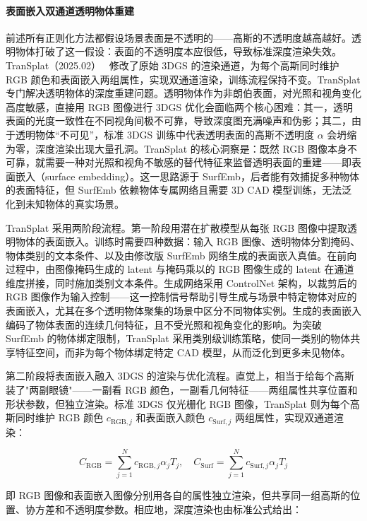 \paragraph{表面嵌入双通道透明物体重建}

前述所有正则化方法都假设场景表面是不透明的——高斯的不透明度越高越好。透明物体打破了这一假设：表面的不透明度本应很低，导致标准深度渲染失效。TranSplat（2025.02）~\cite{2502_07840} 修改了原始 3DGS 的渲染通道，为每个高斯同时维护 RGB 颜色和表面嵌入两组属性，实现双通道渲染，训练流程保持不变。TranSplat 专门解决透明物体的深度重建问题。透明物体作为非朗伯表面，对光照和视角变化高度敏感，直接用 RGB 图像进行 3DGS 优化会面临两个核心困难：其一，透明表面的光度一致性在不同视角间极不可靠，导致深度图充满噪声和伪影；其二，由于透明物体“不可见”，标准 3DGS 训练中代表透明表面的高斯不透明度 $\alpha$ 会坍缩为零，深度渲染出现大量孔洞。TranSplat 的核心洞察是：既然 RGB 图像本身不可靠，就需要一种对光照和视角不敏感的替代特征来监督透明表面的重建——即表面嵌入（surface embedding）。这一思路源于 SurfEmb，后者能有效捕捉多种物体的表面特征，但 SurfEmb 依赖物体专属网络且需要 3D CAD 模型训练，无法泛化到未知物体的真实场景。

TranSplat 采用两阶段流程。第一阶段用潜在扩散模型从每张 RGB 图像中提取透明物体的表面嵌入。训练时需要四种数据：输入 RGB 图像、透明物体分割掩码、物体类别的文本条件、以及由修改版 SurfEmb 网络生成的表面嵌入真值。在前向过程中，由图像掩码生成的 latent 与掩码乘以的 RGB 图像生成的 latent 在通道维度拼接，同时施加类别文本条件。生成网络采用 ControlNet 架构，以裁剪后的 RGB 图像作为输入控制——这一控制信号帮助引导生成与场景中特定物体对应的表面嵌入，尤其在多个透明物体聚集的场景中区分不同物体实例。生成的表面嵌入编码了物体表面的连续几何特征，且不受光照和视角变化的影响。为突破 SurfEmb 的物体绑定限制，TranSplat 采用类别级训练策略，使同一类别的物体共享特征空间，而非为每个物体绑定特定 CAD 模型，从而泛化到更多未见物体。

第二阶段将表面嵌入融入 3DGS 的渲染与优化流程。直觉上，相当于给每个高斯装了"两副眼镜"——一副看 RGB 颜色，一副看几何特征——两组属性共享位置和形状参数，但独立渲染。标准 3DGS 仅光栅化 RGB 图像，TranSplat 则为每个高斯同时维护 RGB 颜色 $c_{\text{RGB},j}$ 和表面嵌入颜色 $c_{\text{Surf},j}$ 两组属性，实现双通道渲染：

\begin{equation}
C_{\text{RGB}} = \sum_{j=1}^{N} c_{\text{RGB},j} \alpha_j T_j, \quad C_{\text{Surf}} = \sum_{j=1}^{N} c_{\text{Surf},j} \alpha_j T_j
\end{equation}

即 RGB 图像和表面嵌入图像分别用各自的属性独立渲染，但共享同一组高斯的位置、协方差和不透明度参数。相应地，深度渲染也由标准公式给出：


